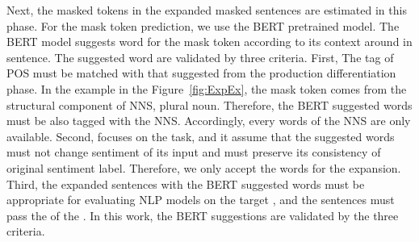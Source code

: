 Next, the masked tokens in the expanded masked sentences are estimated
in this phase. For the mask token prediction, we use the BERT
pretrained model. The BERT model suggests word for the mask token
according to its context around in sentence. The suggested word are
validated by three criteria. First, The tag of POS must be matched with
that suggested from the production differentiation phase. In the
example in the Figure~\ref{fig:ExpEx}, the mask token comes from the
structural component of NNS, plural noun. Therefore, the BERT
suggested words must be also tagged with the NNS. Accordingly, every
words of the NNS are only available. Second, \Model focuses on the \sa
task, and it assume that the suggested words must not change sentiment
of its input and must preserve its consistency of original sentiment
label. Therefore, we only accept the \neu words for the
expansion. Third, the expanded sentences with the BERT suggested words
must be appropriate for evaluating NLP models on the target \lc, and the
sentences must pass the \req of the \lc. In this work, the BERT
suggestions are validated by the three criteria.
